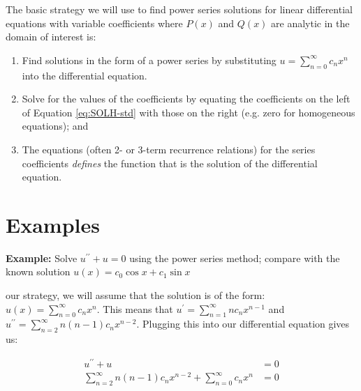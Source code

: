 The basic strategy we will use to find power series solutions for linear differential equations with variable coefficients where $P(x)$ and $Q(x)$ are analytic in the domain of interest is:

\begin{enumerate}
\item Find solutions in the form of a power series by substituting $u = \sum\limits_{n=0}^{\infty} c_n x^n$ into the differential equation.
\item Solve for the values of the coefficients by equating the coefficients on the left of Equation \ref{eq:SOLH-std} with those on the right (e.g. zero for homogeneous equations); and
\item The equations (often 2- or 3-term recurrence relations) for the series coefficients \emph{defines} the function that is the solution of the differential equation.
\end{enumerate}

\section{Examples}

\noindent\textbf{Example:} Solve $u^{\prime \prime}+u = 0$ using the power series method; compare with the known solution $u(x)=c_0\cos{x}+c_1\sin{x}$

 our strategy, we will assume that the solution is of the form: $u(x)=\sum_{n=0}^{\infty} c_n x^n$.  This means that $u^{\prime} = \sum_{n=1}^{\infty} n c_n x^{n-1}$ and $u^{\prime \prime} = \sum_{n=2}^{\infty} n(n-1)c_nx^{n-2}$.  Plugging this into our differential equation gives us:

\begin{align*}
u^{\prime \prime} + u &= 0 \\
\sum\limits_{n=2}^{\infty} n(n-1)c_nx^{n-2} + \sum\limits_{n=0}^{\infty} c_n x^n &= 0
\end{align*}

